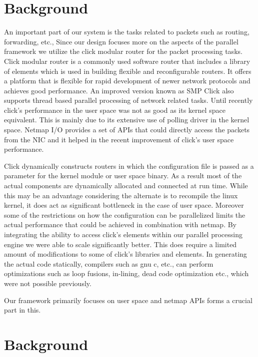 \documentclass[conference]{IEEEtran}
\begin{document}
\section{Background}


An important part of our system is the tasks related to packets such as routing, forwarding, etc., Since our design focuses more on the aspects of the parallel framework we utilize the click modular router for the packet processing tasks. Click modular router \cite{click} is a commonly used software router that includes a library of elements which is used in building flexible and reconfigurable routers. It offers a platform that is flexible for rapid development of newer network protocols and achieves good performance. An improved version known as SMP Click \cite{smpclick} also supports thread based parallel processing of network related tasks. Until recently click's performance in the user space was not as good as its kernel space equivalent. This is mainly due to its extensive use of polling driver in the kernel space. Netmap I/O \cite{netmap} provides a set of APIs that could directly access the packets from the NIC and it helped in the recent improvement of click's user space performance.     

Click dynamically constructs routers in which the configuration file is passed as a parameter for the kernel module or user space binary. As a result most of the actual components are dynamically allocated and connected at run time. While this may be an advantage considering the alternate is to recompile the linux kernel, it does act as significant bottleneck in the case of user space. Moreover some of the restrictions on how the configuration can be parallelized limits the actual performance that could be achieved in combination with netmap. By integrating the ability to access click's elements within our parallel processing engine we were able to scale significantly better. This does require a limited amount of modifications to some of click's libraries and elements. In generating the actual code statically, compilers such as gnu c, etc., can perform optimizations such as loop fusions, in-lining, dead code optimization etc., which were not possible previously.

Our framework primarily focuses on user space and netmap APIs forms a crucial part in this.


\section{Background}
\end{document}
